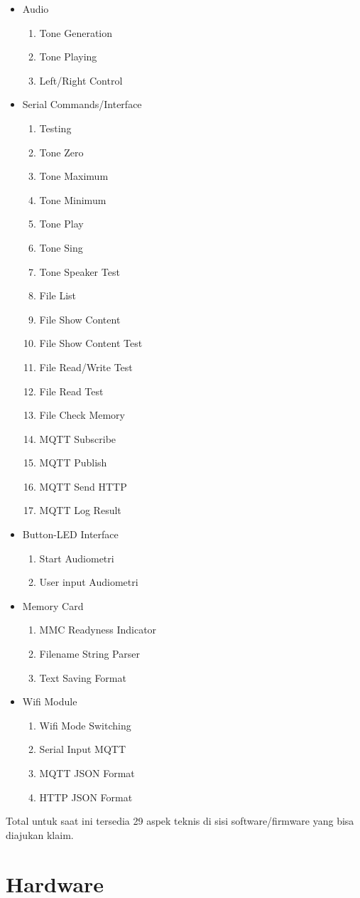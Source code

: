 \documentclass[12pt,]{article}
\begin{document}
	\begin{itemize}
		\item Audio
		\begin{enumerate}
			\item Tone Generation
			\item Tone Playing
			\item Left/Right Control
		\end{enumerate}
	
		\item Serial Commands/Interface
		\begin{enumerate}
			\item Testing
			\item Tone Zero
			\item Tone Maximum
			\item Tone Minimum
			\item Tone Play 
			\item Tone Sing
			\item Tone Speaker Test
			\item File List
			\item File Show Content
			\item File Show Content Test
			\item File Read/Write Test
			\item File Read Test
			\item File Check Memory
			\item MQTT Subscribe
			\item MQTT Publish
			\item MQTT Send HTTP
			\item MQTT Log Result
		\end{enumerate}
	
		\item Button-LED Interface
		\begin{enumerate}
			\item Start Audiometri
			\item User input Audiometri
		\end{enumerate}
	
		\item Memory Card
		\begin{enumerate}
			\item MMC Readyness Indicator
			\item Filename String Parser
			\item Text Saving Format
		\end{enumerate}
	
		\item Wifi Module
		\begin{enumerate}
			\item Wifi Mode Switching
			\item Serial Input MQTT
			\item MQTT JSON Format
			\item HTTP JSON Format
		\end{enumerate}
	\end{itemize}

	Total untuk saat ini tersedia 29 aspek teknis di sisi software/firmware yang bisa diajukan klaim.

	\newpage
	\section{Hardware}
\end{document}
